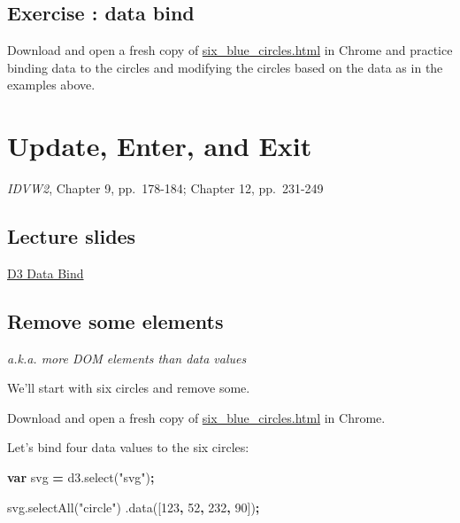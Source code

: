 \documentclass[openany]{book}
\newenvironment{Shaded}{\begin{snugshade}}{\end{snugshade}}
\newcommand{\AttributeTok}[1]{\textcolor[rgb]{0.77,0.63,0.00}{#1}}
\newcommand{\DecValTok}[1]{\textcolor[rgb]{0.00,0.00,0.81}{#1}}
\newcommand{\KeywordTok}[1]{\textcolor[rgb]{0.13,0.29,0.53}{\textbf{#1}}}
\newcommand{\NormalTok}[1]{#1}
\newcommand{\OperatorTok}[1]{\textcolor[rgb]{0.81,0.36,0.00}{\textbf{#1}}}
\newcommand{\StringTok}[1]{\textcolor[rgb]{0.31,0.60,0.02}{#1}}
\newcommand{\VariableTok}[1]{\textcolor[rgb]{0.00,0.00,0.00}{#1}}
\begin{document}
\hypertarget{exercise-data-bind}{%
\section{Exercise : data bind}\label{exercise-data-bind}}

Download and open a fresh copy of \href{https://raw.githubusercontent.com/jtr13/d3book/master/code/six_blue_circles.html}{six\_blue\_circles.html} in Chrome and practice binding data to the circles and modifying the circles based on the data as in the examples above.

\hypertarget{update-enter-and-exit}{%
\chapter{Update, Enter, and Exit }\label{update-enter-and-exit}}

\emph{IDVW2}, Chapter 9, pp.~178-184; Chapter 12, pp.~231-249

\hypertarget{lecture-slides}{%
\section{Lecture slides }\label{lecture-slides}}

\href{https://github.com/jtr13/D3/blob/master/UpdateEnterExit.pdf}{D3 Data Bind}

\hypertarget{remove-some-elements}{%
\section{Remove some elements }\label{remove-some-elements}}

\emph{a.k.a. more DOM elements than data values}

We'll start with six circles and remove some.

Download and open a fresh copy of \href{https://raw.githubusercontent.com/jtr13/d3book/master/code/six_blue_circles.html}{six\_blue\_circles.html} in Chrome.

Let's bind four data values to the six circles:

\begin{Shaded}
\begin{Highlighting}[]
\KeywordTok{var}\NormalTok{ svg }\OperatorTok{=} \VariableTok{d3}\NormalTok{.}\AttributeTok{select}\NormalTok{(}\StringTok{"svg"}\NormalTok{)}\OperatorTok{;}

\VariableTok{svg}\NormalTok{.}\AttributeTok{selectAll}\NormalTok{(}\StringTok{"circle"}\NormalTok{)}
\NormalTok{    .}\AttributeTok{data}\NormalTok{([}\DecValTok{123}\OperatorTok{,} \DecValTok{52}\OperatorTok{,} \DecValTok{232}\OperatorTok{,} \DecValTok{90}\NormalTok{])}\OperatorTok{;}
\end{Highlighting}
\end{Shaded}
\end{document}
